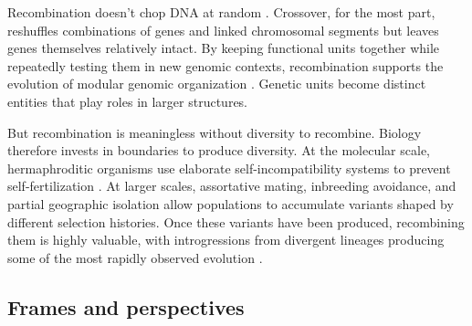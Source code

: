 \documentclass[12pt]{article}
\newcommand{\zeb}[1]{{\footnotesize\textcolor{red}{[Zeb: #1]}}}
\begin{document}
Recombination doesn't chop DNA at random \citep{zickler2015recombination, paigen2010mammalian}. Crossover, for the most part, reshuffles combinations of genes and linked chromosomal segments but leaves genes themselves relatively intact. By keeping functional units together while repeatedly testing them in new genomic contexts, recombination supports the evolution of modular genomic organization \citep{wagner1996perspective, melo2016modularity, kirschner1998evolvability}. Genetic units become distinct entities that play roles in larger structures.

But recombination is meaningless without diversity to recombine. Biology therefore invests in boundaries to produce diversity. At the molecular scale, hermaphroditic organisms use elaborate self-incompatibility systems to prevent self-fertilization \citep{charlesworth2005plant,de1997incompatibility}. At larger scales, assortative mating, inbreeding avoidance, and partial geographic isolation allow populations to accumulate variants shaped by different selection histories. Once these variants have been produced, recombining them is highly valuable, with introgressions from divergent lineages producing some of the most rapidly observed evolution \citep{seehausen2014genomics,marques2019combinatorial}. 



 










\subsection{Frames and perspectives} 

\end{document}
